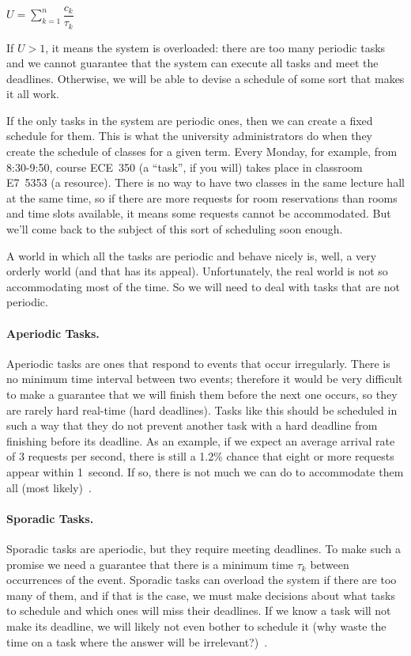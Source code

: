 \begin{center}
$U = \sum\limits_{k=1}^n\dfrac{c_{k}}{\tau_{k}}$
\end{center}

If $U > 1$, it means the system is overloaded: there are too many periodic tasks and we cannot guarantee that the system can execute all tasks and meet the deadlines. Otherwise, we will be able to devise a schedule of some sort that makes it all work.

If the only tasks in the system are periodic ones, then we can create a fixed schedule for them. This is what the university administrators do when they create the schedule of classes for a given term. Every Monday, for example, from 8:30-9:50, course ECE~350 (a ``task'', if you will) takes place in classroom E7~5353 (a resource). There is no way to have two classes in the same lecture hall at the same time, so if there are more requests for room reservations than rooms and time slots available, it means some requests cannot be accommodated. But we'll come back to the subject of this sort of scheduling soon enough.

A world in which all the tasks are periodic and behave nicely is, well, a very orderly world (and that has its appeal). Unfortunately, the real world is not so accommodating most of the time. So we will need to deal with tasks that are not periodic.

\paragraph{Aperiodic Tasks.}
Aperiodic tasks are ones that respond to events that occur irregularly. There is no minimum time interval between two events; therefore it would be very difficult to make a guarantee that we will finish them before the next one occurs, so they are rarely hard real-time (hard deadlines). Tasks like this should be scheduled in such a way that they do not prevent another task with a hard deadline from finishing before its deadline. As an example, if we expect an average arrival rate of 3 requests per second, there is still a 1.2\% chance that eight or more requests appear within 1~second. If so, there is not much we can do to accommodate them all (most likely)~\cite{mte241}.

\paragraph{Sporadic Tasks.}
Sporadic tasks are aperiodic, but they require meeting deadlines. To make such a promise we need a guarantee that there is a minimum time $\tau_{k}$ between occurrences of the event. Sporadic tasks can overload the system if there are too many of them, and if that is the case, we must make decisions about what tasks to schedule and which ones will miss their deadlines. If we know a task will not make its deadline, we will likely not even bother to schedule it (why waste the time on a task where the answer will be irrelevant?)~\cite{mte241}.

